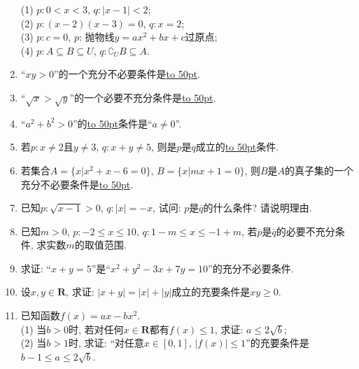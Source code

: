 \documentclass[10pt,a4paper]{article}
\newcommand{\blank}[1]{\underline{\hbox to #1pt{}}}
\begin{document}
\begin{enumerate}[1.]
(1) $p:0<x<3$, $q:|x-1|<2$;\\
(2) $p:(x-2)(x-3)=0$, $q:x=2$;\\
(3) $p:c=0$, $p$: 抛物线$y=ax^2+bx+c$过原点;\\
(4) $p:A\subseteq B\subseteq U$, $q:\complement_UB\subseteq A$.
\item ``$xy>0$''的一个充分不必要条件是\blank{50}.
\item ``$\sqrt x>\sqrt y$''的一个必要不充分条件是\blank{50}.
\item ``$a^2+b^2>0$''的\blank{50}条件是``$a\ne 0$''.
\item 若$p:x\ne 2$且$y\ne 3$, $q:x+y\ne 5$, 则是$p$是$q$成立的\blank{50}条件.
\item 若集合$A=\{x|x^2+x-6=0\}$, $B=\{x|mx+1=0\}$, 则$B$是$A$的真子集的一个充分不必要条件是\blank{50}.
\item 已知$p:\sqrt{x-1}>0$, $q:|x|=-x$, 试问: $p$是$\overline q$的什么条件? 请说明理由.
\item 已知$m>0$, $p:-2\le x\le 10$, $q:1-m\le x\le -1+m$, 若$\overline p$是$\overline q$的必要不充分条件, 求实数$m$的取值范围.
\item 求证: ``$x+y=5$''是``$x^2+y^2-3x+7y=10$''的充分不必要条件.
\item 设$x,y\in \mathbf{R}$, 求证: $|x+y|=|x|+|y|$成立的充要条件是$xy\ge 0$.
\item 已知函数$f(x)=ax-bx^2$.\\
(1) 当$b>0$时, 若对任何$x\in \mathbf{R}$都有$f(x)\le 1$, 求证: $a\le 2\sqrt b$;\\
(2) 当$b>1$时, 求证: ``对任意$x\in [0,1]$, $|f(x)|\le 1$''的充要条件是$b-1\le a\le 2\sqrt b$.
\end{enumerate}
\end{document}
